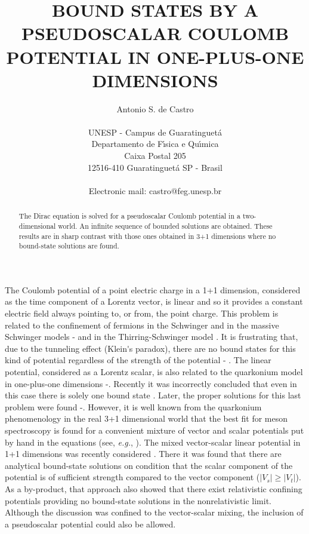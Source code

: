 \documentclass[a4paper,12pt,titlepage]{article}
\begin{document}
\title{BOUND STATES BY A PSEUDOSCALAR COULOMB POTENTIAL IN ONE-PLUS-ONE DIMENSIONS}
\date{}
\author{Antonio S. de Castro \\
\\
UNESP - Campus de Guaratinguet\'{a}\\
Departamento de F\'{\i}sica e Qu\'{\i}mica\\
Caixa Postal 205\\
12516-410 Guaratinguet\'{a} SP - Brasil\\
\\
Electronic mail: castro@feg.unesp.br}
\maketitle

\begin{abstract}
The Dirac equation is solved for a pseudoscalar Coulomb potential in a
two-dimensional world. An infinite sequence of bounded solutions are
obtained. These results are in sharp contrast with those ones obtained in
3+1 dimensions where no bound-state solutions are found.
\end{abstract}

The Coulomb potential of a point electric charge in a 1+1 dimension,
considered as the time component of a Lorentz vector, is linear and so it
provides a constant electric field always pointing to, or from, the point
charge. This problem is related to the confinement of fermions in the
Schwinger and in the massive Schwinger models \cite{col1}-\cite{col2} and in
the Thirring-Schwinger model \cite{fro}. It is frustrating that, due to the
tunneling effect (Klein\'{}s paradox), there are no bound states for this
kind of potential regardless of the strength of the potential \cite{cap}-%
\cite{gal}. The linear potential, considered as a Lorentz scalar, is also
related to the quarkonium model in one-plus-one dimensions \cite{hoo}-\cite
{kog}. Recently it was incorrectly concluded that even in this case there is
solely one bound state \cite{bha}. Later, the proper solutions for this last
problem were found \cite{cas}-\cite{hil}. However, it is well known from the
quarkonium phenomenology in the real 3+1 dimensional world that the best fit
for meson spectroscopy is found for a convenient mixture of vector and
scalar potentials put by hand in the equations (see, \textit{e.g.}, \cite
{luc}). The mixed vector-scalar linear potential in 1+1 dimensions was
recently considered \cite{asc1}. There it was found that there are
analytical bound-state solutions on condition that the scalar component of
the potential is of sufficient strength compared to the vector component ($%
|V_{s}|\geq |V_{t}|$). As a by-product, that approach also showed that there
exist relativistic confining potentials providing no bound-state solutions
in the nonrelativistic limit. Although the discussion was confined to the
vector-scalar mixing, the inclusion of a pseudoscalar potential could also
be allowed.
\end{document}
